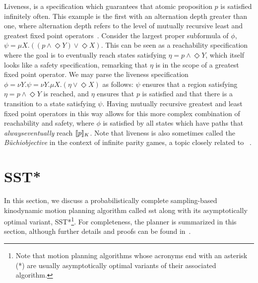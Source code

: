 \begin{enumerate}[label = (\roman*)]
    Liveness, is a specification which guarantees that atomic proposition $p$ is satisfied infinitely often. This example is the first with an alternation depth greater than one, where alternation depth refers to the level of mutually recursive least and greatest fixed point operators~\cite{Wilke2001}.
    Consider the largest proper subformula of $\phi$, $\psi = {\mu X.((p \land \Diamond Y) \lor \Diamond X)}$. This can be seen as a reachability specification where the goal is to eventually reach states satisfying $\eta = p \land \Diamond Y$, which itself looks like a safety specification, remarking that $\eta$ is in the scope of a greatest fixed point operator. We may parse the liveness specification $\phi = {\nu Y.\psi} = {\nu Y.\mu X.(\eta \lor \Diamond X)}$ as follows: $\psi$ ensures that a region satisfying ${\eta = p \land \Diamond Y}$ is reached, and $\eta$ ensures that $p$ is satisfied and that there is a transition to a state satisfying $\psi$. Having mutually recursive greatest and least fixed point operators in this way allows for this more complex combination of reachability and safety, where $\phi$ is satisfied by all states which have paths that {\it always\/eventually} reach ${\llbracket}{} p {\rrbracket}{}_K$. Note that liveness is also sometimes called the {\it B\"uchi\/objective} in the context of infinite parity games, a topic closely related to \mucalc{}~\cite{Emerson1991,Karaman2012,Wilke2001}.
\end{enumerate}

\section{SST*}

In this section, we discuss a probabilistically complete sampling-based kinodynamic motion planning algorithm called \gls{sst} along with its asymptotically optimal variant, SST*\footnote{Note that motion planning algorithms whose acronyms end with an asterisk (*) are usually asymptotically optimal variants of their associated algorithm.}. For completeness, the planner is summarized in this section, although further details and proofs can be found in~\cite{Li2016}.

